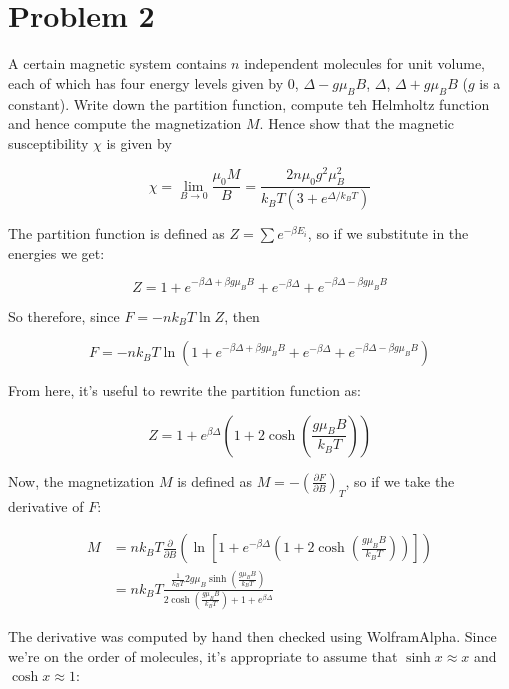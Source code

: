 \documentclass[10pt]{article}
\begin{document}
    \pagebreak

    \section*{Problem 2}

    A certain magnetic system contains $n$ independent molecules for unit volume, each of which has four energy levels given by $0$, $\Delta - g\mu_B B$, $\Delta$, $\Delta + g\mu_BB$ ($g$ is a constant). Write down the partition function, compute teh Helmholtz function and hence compute the magnetization $M$. Hence show that the magnetic susceptibility $\chi$ is given by 
    
    \[ \chi = \lim_{B \to 0} \frac{\mu_0M}{B} = \frac{2 n \mu_0 g^2 \mu_B^2}{k_BT (3 + e^{\Delta/k_BT})}\]

    \begin{solution}
        The partition function is defined as $Z = \sum e^{-\beta E_i}$, so if we substitute in the energies we get:

        \[Z = 1 + e^{-\beta\Delta + \beta g\mu_BB} + e^{-\beta \Delta} + e^{-\beta \Delta - \beta g\mu_BB}\]

        So therefore, since $F = -nk_BT \ln Z$, then 

        \[ F = -nk_BT \ln (1 + e^{-\beta\Delta + \beta g\mu_BB} + e^{-\beta \Delta} + e^{-\beta \Delta - \beta g\mu_BB})\]

        From here, it's useful to rewrite the partition function as: 

        \[ Z = 1 + e^{\beta \Delta} \left(1 + 2 \cosh \left(\frac{g\mu_BB}{k_BT}\right)\right)\]

        Now, the magnetization $M$ is defined as $M = -\left(\frac{\partial F}{\partial B}\right)_T$, so if we take the derivative of $F$: 


        \begin{align*}
            M &= nk_BT \frac{\partial}{\partial B} \left(\ln \left[ 1 + e^{-\beta \Delta}\left( 1 + 2\cosh\left(\frac{g \mu_BB}{k_BT}\right)\right)\right]\right)\\
            &= nk_BT\frac{\frac{1}{k_BT} 2g\mu_B  \sinh\left(\frac{g\mu_BB}{k_BT}\right)}{2 \cosh \left(\frac{g\mu_BB}{k_BT}\right) + 1 + e^{\beta \Delta}}
        \end{align*}

        The derivative was computed by hand then checked using WolframAlpha. Since we're on the order of molecules, it's appropriate to assume that $\sinh x \approx x$ and $\cosh x \approx 1$:


\end{solution}
\end{document}
